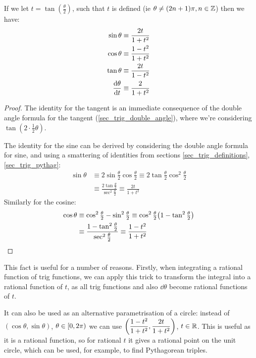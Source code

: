 \begin{theorem}
If we let \(t = \tan(\frac \theta 2)\), such that \(t\) is defined (ie
\(\theta \ne (2n + 1)\pi, n \in \mathbb Z\)) then we have:
\begin{align*}
\sin \theta &\equiv \dfrac{2t}{1 + t^2} \\
\cos \theta &\equiv \dfrac{1 - t^2}{1 + t^2} \\
\tan \theta &\equiv \dfrac{2t}{1 - t^2} \\
\dv{\theta}{t} &\equiv \dfrac 2{1 + t^2}
\end{align*}
\end{theorem}
\begin{proof}
The identity for the tangent is an immediate consequence of the double
angle formula for the tangent (\ref{sec_trig_double_angle}), where we're
considering \(\tan(2 \cdot \frac 12 \theta)\).

The identity for the sine can be derived by considering the double angle
formula for sine, and using a smattering of identities from sections
\ref{sec_trig_definitions}, \ref{sec_trig_pythag}:
\begin{align*}
\sin \theta &\equiv 2\sin \tfrac \theta 2 \cos\tfrac \theta 2
    \equiv 2\tan \tfrac \theta 2 \cos^2 \tfrac \theta 2 \\
    &\equiv \frac{2\tan \frac \theta 2}{\sec^2 \frac \theta 2}
    \equiv \frac{2t}{1 + t^2}
\end{align*}
Similarly for the cosine:
\begin{align*}
\cos \theta
    &\equiv \cos^2 \tfrac \theta 2 - \sin^2 \tfrac \theta 2
    \equiv \cos^2 \tfrac \theta 2
        \pqty{1 - \tan^2 \tfrac \theta 2} \\
    &\equiv \frac{1 - \tan^2 \tfrac \theta 2}
                 {\sec^2 \tfrac \theta 2}
    \equiv \frac{1 - t^2}{1 + t^2} \qedhere
\end{align*}
\end{proof}

This fact is useful for a number of reasons. Firstly, when integrating a
rational function of trig functions, we can apply this trick to transform
the integral into a rational function of \(t\), as all trig functions and
also \(\dd{\theta}\) become rational functions of \(t\).

It can also be used as an alternative parametrisation of a circle: instead
of \((\cos\theta, \sin\theta)\), \(\theta \in [0, 2\pi)\) we can use
\(\pqty{\dfrac{1 - t^2}{1 + t^2}, \dfrac{2t}{1 + t^2}}\), \(t \in \mathbb R\).
This is useful as it is a rational function, so for rational \(t\) it gives
a rational point on the unit circle, which can be used, for example, to find
Pythagorean triples.

